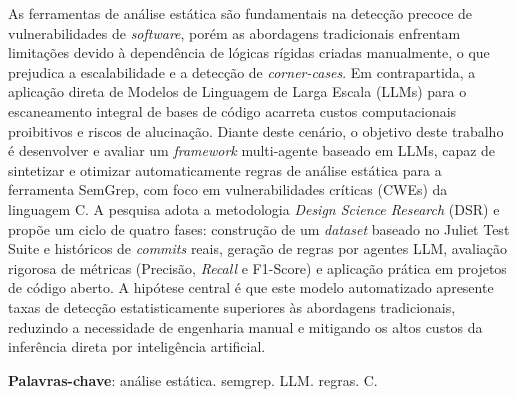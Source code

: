 \documentclass[
    12pt,                %
    openright,           %
    oneside,             %
    a4paper,             %
    english,             %
    brazil               %
]{abntex2}
\begin{document}

\frenchspacing

\pretextual

\imprimircapa

\imprimirfolhaderosto

\begin{resumo}
  As ferramentas de análise estática são fundamentais na detecção precoce de vulnerabilidades de \textit{software}, porém as abordagens tradicionais enfrentam limitações devido à dependência de lógicas rígidas criadas manualmente, o que prejudica a escalabilidade e a detecção de \textit{corner-cases}. 
Em contrapartida, a aplicação direta de Modelos de Linguagem de Larga Escala (LLMs) para o escaneamento integral de bases de código acarreta custos computacionais proibitivos e riscos de alucinação. 
Diante deste cenário, o objetivo deste trabalho é desenvolver e avaliar um \textit{framework} multi-agente baseado em LLMs, capaz de sintetizar e otimizar automaticamente regras de análise estática para a ferramenta SemGrep, com foco em vulnerabilidades críticas (CWEs) da linguagem C. 
A pesquisa adota a metodologia \textit{Design Science Research} (DSR) e propõe um ciclo de quatro fases: construção de um \textit{dataset} baseado no Juliet Test Suite e históricos de \textit{commits} reais, geração de regras por agentes LLM, avaliação rigorosa de métricas (Precisão, \textit{Recall} e F1-Score) e aplicação prática em projetos de código aberto.
A hipótese central é que este modelo automatizado apresente taxas de detecção estatisticamente superiores às abordagens tradicionais, reduzindo a necessidade de engenharia manual e mitigando os altos custos da inferência direta por inteligência artificial.

\vspace{\onelineskip}
\noindent
\textbf{Palavras-chave}: análise estática. semgrep. LLM. regras. C.
\end{resumo}
\end{document}
